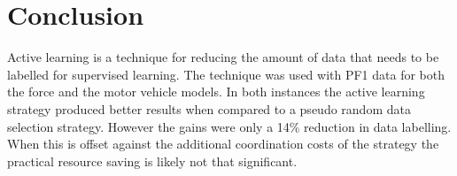\section{Conclusion} Active learning is a technique for reducing the amount of data that needs to be labelled for supervised learning. The technique was used with PF1 data for both the force and the motor vehicle models. In both instances the active learning strategy produced better results when compared to a pseudo random data selection strategy. However the gains were only a 14\% reduction in data labelling. When this is offset against the additional coordination costs of the strategy the practical resource saving is likely not that significant. 
 
